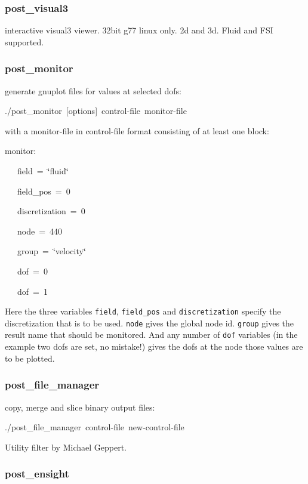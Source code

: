 \subsubsection{post\_visual3}

interactive visual3 viewer. 32bit g77 linux only. 2d and 3d. Fluid
and FSI supported.


\subsubsection{post\_monitor}

generate gnuplot files for values at selected dofs:

\begin{lyxcode}
./post\_monitor~{[}options]~control-file~monitor-file
\end{lyxcode}
with a monitor-file in control-file format consisting of at least
one block:

\begin{lyxcode}
monitor:

~~~field~=~\char`\"{}fluid\char`\"{}

~~~field\_pos~=~0

~~~discretization~=~0

~~~node~=~440

~~~group~=~\char`\"{}velocity\char`\"{}

~~~dof~=~0

~~~dof~=~1
\end{lyxcode}
Here the three variables \texttt{field}, \texttt{field\_pos} and \texttt{discretization}
specify the discretization that is to be used. \texttt{node} gives
the global node id. \texttt{group} gives the result name that should
be monitored. And any number of \texttt{dof} variables (in the example
two dofs are set, no mistake!) gives the dofs at the node those values
are to be plotted.


\subsubsection{post\_file\_manager}

copy, merge and slice binary output files:

\begin{lyxcode}
./post\_file\_manager~control-file~new-control-file
\end{lyxcode}
Utility filter by Michael Geppert.


\subsubsection{post\_ensight}

